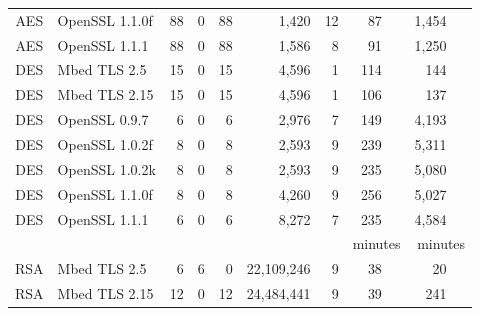 \begin{table}
\begin{tabular}{clrrrrrrr}
        AES                & OpenSSL 1.1.0f           & 88                    & 0                   & 88                   & 1,420       & 12   & 87 ~~     & 1,454 ~~        \\
        AES                & OpenSSL 1.1.1            & 88                    & 0                   & 88                   & 1,586       & 8    & 91 ~~     & 1,250 ~~        \\
        DES                & Mbed TLS 2.5             & 15                    & 0                   & 15                   & 4,596       & 1    & 114 ~~    & 144 ~~          \\
        DES                & Mbed TLS 2.15            & 15                    & 0                   & 15                   & 4,596       & 1    & 106 ~~    & 137 ~~          \\
        DES                & OpenSSL 0.9.7            & 6                     & 0                   & 6                    & 2,976       & 7    & 149 ~~    & 4,193       ~~  \\
        DES                & OpenSSL 1.0.2f           & 8                     & 0                   & 8                    & 2,593       & 9    & 239 ~~    & 5,311       ~~  \\
        DES                & OpenSSL 1.0.2k           & 8                     & 0                   & 8                    & 2,593       & 9    & 235 ~~    & 5,080        ~~ \\
        DES                & OpenSSL 1.1.0f           & 8                     & 0                   & 8                    & 4,260       & 9    & 256 ~~    & 5,027        ~~ \\
        DES                & OpenSSL 1.1.1            & 6                     & 0                   & 6                    & 8,272       & 7    & 235 ~~    & 4,584       ~~  \\
                           &                          &                       &                     &                      &             &      & minutes   & minutes         \\\cline{8-9}
        RSA                & Mbed TLS 2.5             & 6                     & 6                   & 0                    & 22,109,246  & 9    & 38 ~~     & 20  ~~          \\
        RSA                & Mbed TLS 2.15            & 12                    & 0                   & 12                   & 24,484,441  & 9    & 39 ~~     & 241  ~~         \\

\end{tabular}
\end{table}
